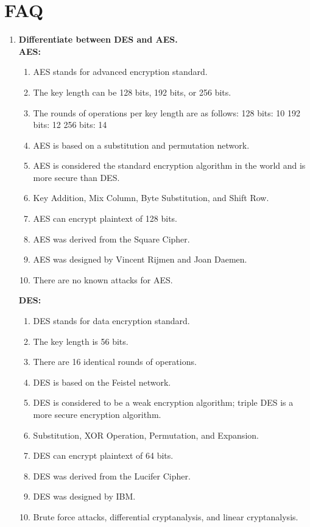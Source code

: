 \documentclass[openany]{book}
\begin{document}
\section{FAQ}

\begin{enumerate}
	\item \textbf{Differentiate between DES and AES.}\\
	      \textbf{AES: }
	      \begin{enumerate}
		      \item AES stands for advanced encryption standard.
		      \item The key length can be 128 bits, 192 bits, or 256 bits.
		      \item The rounds of operations per key length are as follows: 128 bits: 10 192 bits: 12 256 bits: 14
		      \item AES is based on a substitution and permutation network.
		      \item AES is considered the standard encryption algorithm in the world and is more secure than DES.
		      \item Key Addition, Mix Column, Byte Substitution, and Shift Row.
		      \item AES can encrypt plaintext of 128 bits.
		      \item AES was derived from the Square Cipher.
		      \item AES was designed by Vincent Rijmen and Joan Daemen.
		      \item There are no known attacks for AES.
	      \end{enumerate}

	      \textbf{DES: }
	      \begin{enumerate}
		      \item DES stands for data encryption standard.
		      \item The key length is 56 bits.
		      \item There are 16 identical rounds of operations.
		      \item DES is based on the Feistel network.
		      \item DES is considered to be a weak encryption algorithm; triple DES is a more secure encryption algorithm.
		      \item Substitution, XOR Operation, Permutation, and Expansion.
		      \item DES can encrypt plaintext of 64 bits.
		      \item DES was derived from the Lucifer Cipher.
		      \item DES was designed by IBM.
		      \item Brute force attacks, differential cryptanalysis, and linear cryptanalysis.
	      \end{enumerate}


\end{enumerate}
\end{document}
